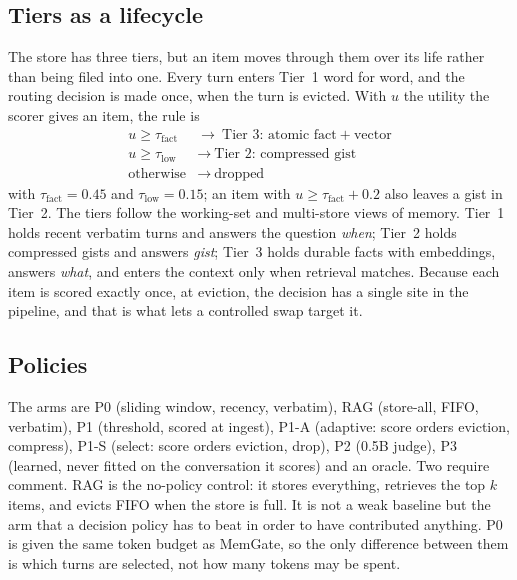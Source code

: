 \subsection{Tiers as a lifecycle}
The store has three tiers, but an item moves through them over its life
rather than being filed into one. Every turn enters Tier~1 word for word, and
the routing decision is made once, when the turn is evicted. With $u$ the
utility the scorer gives an item, the rule is
\begin{equation}
\label{eq:route}
\begin{array}{ll}
u \geq \tau_{\text{fact}} & \rightarrow\ \text{Tier 3: atomic fact}+\text{vector}\\
u \geq \tau_{\text{low}}  & \rightarrow\ \text{Tier 2: compressed gist}\\
\text{otherwise}          & \rightarrow\ \text{dropped}
\end{array}
\end{equation}
with $\tau_{\text{fact}}=0.45$ and $\tau_{\text{low}}=0.15$; an item with
$u\ge\tau_{\text{fact}}+0.2$ also leaves a gist in Tier~2.
The tiers follow the working-set \cite{denning1968workingset} and multi-store
\cite{atkinson1968memory} views of memory.
Tier~1 holds recent verbatim turns and answers the question \emph{when};
Tier~2 holds compressed gists and answers \emph{gist}; Tier~3 holds durable
facts with embeddings, answers \emph{what}, and enters the context only when
retrieval matches. Because each item is scored exactly once, at eviction, the decision has a
single site in the pipeline, and that is what lets a controlled swap target
it.

\subsection{Policies}
The arms are P0 (sliding window, recency, verbatim), RAG (store-all, FIFO, verbatim), P1 (threshold, scored at ingest), P1-A (adaptive: score orders eviction, compress), P1-S (select: score orders eviction, drop), P2 (0.5B judge), P3 (learned, never fitted on the conversation it scores) and an oracle. Two require comment. RAG is the
no-policy control: it stores everything, retrieves the top $k$ items, and
evicts FIFO when the store is full. It is not a weak baseline but the arm that
a decision policy has to beat in order to have contributed anything. P0 is
given the same token budget as MemGate, so the only difference between them is
which turns are selected, not how many tokens may be spent.


